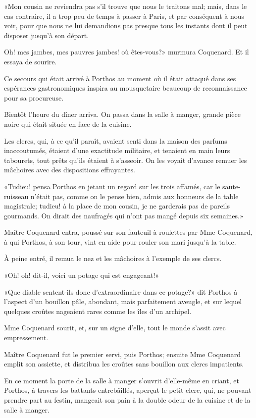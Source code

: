 «Mon cousin ne reviendra pas s'il trouve que nous le traitons mal; mais, dans le cas contraire, il a trop peu de temps à passer à Paris, et par conséquent à nous voir, pour que nous ne lui demandions pas presque tous les instants dont il peut disposer jusqu'à son départ. 

\speak  Oh! mes jambes, mes pauvres jambes! où êtes-vous?» murmura Coquenard. Et il essaya de sourire. 

Ce secours qui était arrivé à Porthos au moment où il était attaqué dans ses espérances gastronomiques inspira au mousquetaire beaucoup de reconnaissance pour sa procureuse. 

Bientôt l'heure du dîner arriva. On passa dans la salle à manger, grande pièce noire qui était située en face de la cuisine. 

Les clercs, qui, à ce qu'il paraît, avaient senti dans la maison des parfums inaccoutumés, étaient d'une exactitude militaire, et tenaient en main leurs tabourets, tout prêts qu'ils étaient à s'asseoir. On les voyait d'avance remuer les mâchoires avec des dispositions effrayantes. 

«Tudieu! pensa Porthos en jetant un regard sur les trois affamés, car le saute-ruisseau n'était pas, comme on le pense bien, admis aux honneurs de la table magistrale; tudieu! à la place de mon cousin, je ne garderais pas de pareils gourmands. On dirait des naufragés qui n'ont pas mangé depuis six semaines.» 

Maître Coquenard entra, poussé sur son fauteuil à roulettes par Mme Coquenard, à qui Porthos, à son tour, vint en aide pour rouler son mari jusqu'à la table. 

À peine entré, il remua le nez et les mâchoires à l'exemple de ses clercs. 

«Oh! oh! dit-il, voici un potage qui est engageant!» 

«Que diable sentent-ils donc d'extraordinaire dans ce potage?» dit Porthos à l'aspect d'un bouillon pâle, abondant, mais parfaitement aveugle, et sur lequel quelques croûtes nageaient rares comme les îles d'un archipel. 

Mme Coquenard sourit, et, sur un signe d'elle, tout le monde s'assit avec empressement. 

Maître Coquenard fut le premier servi, puis Porthos; ensuite Mme Coquenard emplit son assiette, et distribua les croûtes sans bouillon aux clercs impatients. 

En ce moment la porte de la salle à manger s'ouvrit d'elle-même en criant, et Porthos, à travers les battants entrebâillés, aperçut le petit clerc, qui, ne pouvant prendre part au festin, mangeait son pain à la double odeur de la cuisine et de la salle à manger. 

